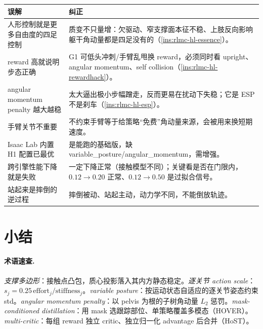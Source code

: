 \begin{center}
\small
\begin{tabular}{p{5.0cm}p{8.0cm}}
\hline
误解 & 纠正 \\
\hline
人形控制就是更多自由度的四足控制 & 质变不只量增：欠驱动、窄支撑面本征不稳、上肢反向影响躯干角动量都是四足没有的（\cref{ins:rlmc-hl-essence}）。 \\
reward 高就说明步态正确 & G1 可低头冲刺/手臂乱甩换 reward，必须同时看 upright、angular momentum、self collision（\cref{ins:rlmc-hl-rewardhack}）。 \\
angular momentum penalty 越大越稳 & 太大逼出极小步幅蹭走，反而更易在扰动下失稳；它是 ESP 不是刹车（\cref{ins:rlmc-hl-esp}）。 \\
手臂关节不重要 & 不约束手臂等于给策略“免费”角动量来源，会被用来换短期速度。 \\
Isaac Lab 内置 H1 配置已最优 & 是能跑的基础版，缺 variable\_posture/angular\_momentum，需增强。 \\
跨引擎性能下降就是失败 & 一定下降正常（接触模型不同）；关键看是否在门限内，$0.12\to0.20$ 正常、$0.12\to0.50$ 是过拟合信号。 \\
站起来是摔倒的逆过程 & 摔倒被动、站起主动，动力学不同，不能倒放轨迹。 \\
\hline
\end{tabular}
\end{center}

\section*{小结}

\paragraph{术语速查.}
\emph{支撑多边形}：接触点凸包，质心投影落入其内方静态稳定。\emph{逐关节 action scale}：$s_j=0.25\,\text{effort}_j/\text{stiffness}_j$。\emph{variable posture}：按运动状态自适应的逐关节姿态约束 std。\emph{angular momentum penalty}：以 pelvis 为根的子树角动量 $L_2$ 惩罚。\emph{mask-conditioned distillation}：用 mask 选跟踪部位、单策略覆盖多模态（HOVER）。\emph{multi-critic}：每组 reward 独立 critic、独立归一化 advantage 后合并（HoST）。

